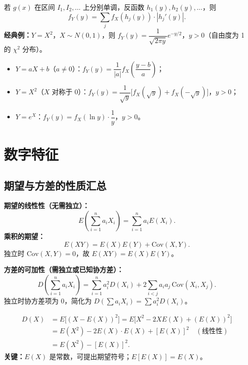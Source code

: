 \documentclass[11pt,a4paper]{article}
\begin{document}
\begin{variation}[分段单调的处理]
若 $g(x)$ 在区间 $I_1,I_2,\dots$ 上分别单调，反函数 $h_1(y),h_2(y),\dots$，则
\[
f_Y(y) = \sum_{j} f_X(h_j(y))\cdot |h_j'(y)|.
\]
\textbf{经典例：}$Y=X^2$，$X\sim N(0,1)$，则 $f_Y(y)=\dfrac{1}{\sqrt{2\pi y}}e^{-y/2}$，$y>0$（自由度为 1 的 $\chi^2$ 分布）。
\end{variation}

\begin{examtip}[常见函数的密度]
\begin{itemize}[leftmargin=2em]
  \item $Y=aX+b$（$a\neq 0$）：$f_Y(y)=\dfrac{1}{|a|}f_X\!\left(\dfrac{y-b}{a}\right)$；
  \item $Y=X^2$（$X$ 对称于 0）：$f_Y(y)=\dfrac{1}{\sqrt{y}}\bigl[f_X(\sqrt y)+f_X(-\sqrt y)\bigr]$，$y>0$；
  \item $Y=e^X$：$f_Y(y)=f_X(\ln y)\cdot\dfrac{1}{y}$，$y>0$。
\end{itemize}
\end{examtip}

\section{数字特征}

\subsection{期望与方差的性质汇总}

\begin{variation}[期望与方差的运算性质]
\textbf{期望的线性性（无需独立）：}
\[
E\!\left(\sum_{i=1}^n a_i X_i\right) = \sum_{i=1}^n a_i E(X_i).
\]
\textbf{乘积的期望：}
\[
E(XY) = E(X)E(Y) + \mathrm{Cov}(X,Y).
\]
独立时 $\mathrm{Cov}(X,Y)=0$，故 $E(XY)=E(X)E(Y)$。

\textbf{方差的可加性（需独立或已知协方差）：}
\[
D\!\left(\sum_{i=1}^n a_i X_i\right) = \sum_{i=1}^n a_i^2 D(X_i) + 2\sum_{i<j} a_i a_j\,\mathrm{Cov}(X_i,X_j).
\]
独立时协方差项为 0，简化为 $D\!\left(\sum a_i X_i\right)=\sum a_i^2 D(X_i)$。
\end{variation}

\begin{derivation}[{方差公式 $D(X)=E(X^2)-[E(X)]^2$ 的推导}]
\begin{align*}
D(X) &= E\bigl[(X-E(X))^2\bigr] = E\bigl[X^2 - 2XE(X) + (E(X))^2\bigr] \\
&= E(X^2) - 2E(X)\cdot E(X) + [E(X)]^2 \quad (\text{线性性})\\
&= E(X^2) - [E(X)]^2.
\end{align*}
\textbf{关键：}$E(X)$ 是常数，可提出期望符号；$E[E(X)]=E(X)$。
\end{derivation}
\end{document}
